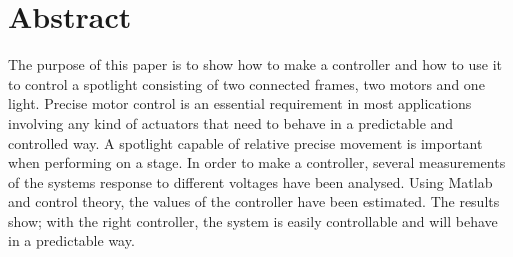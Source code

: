 \section{Abstract}

The purpose of this paper is to show how to make a controller and how to use it to control a spotlight consisting of two connected frames, two motors and one light. Precise motor control is an essential requirement in most applications involving any kind of actuators that need to behave in a predictable and controlled way. A spotlight capable of relative precise movement is important when performing on a stage. In order to make a controller, several measurements of the systems response to different voltages have been analysed. Using Matlab and control theory, the values of the controller have been estimated. The results show; with the right controller, the system is easily controllable and will behave in a predictable way.